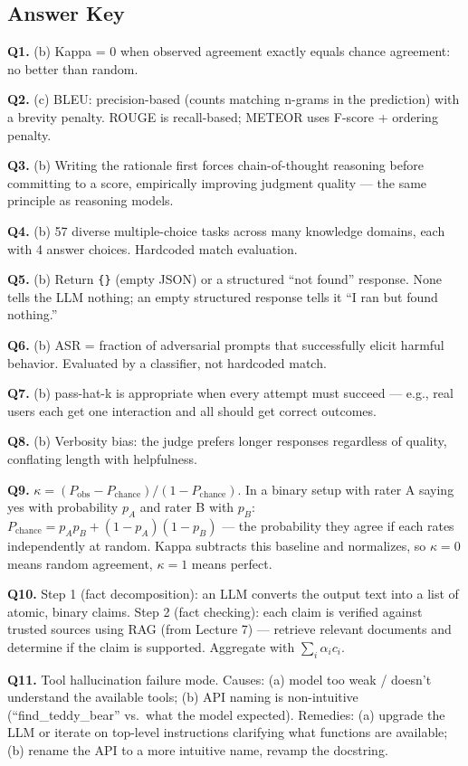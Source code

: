 \documentclass[11pt, a4paper]{article}
\begin{document}
\subsection*{Answer Key}

\textbf{Q1.} (b) Kappa = 0 when observed agreement exactly equals chance agreement: no better than random.

\textbf{Q2.} (c) BLEU: precision-based (counts matching n-grams in the prediction) with a brevity penalty. ROUGE is recall-based; METEOR uses F-score + ordering penalty.

\textbf{Q3.} (b) Writing the rationale first forces chain-of-thought reasoning before committing to a score, empirically improving judgment quality --- the same principle as reasoning models.

\textbf{Q4.} (b) 57 diverse multiple-choice tasks across many knowledge domains, each with 4 answer choices. Hardcoded match evaluation.

\textbf{Q5.} (b) Return \texttt{\{\}} (empty JSON) or a structured ``not found'' response. None tells the LLM nothing; an empty structured response tells it ``I ran but found nothing.''

\textbf{Q6.} (b) ASR = fraction of adversarial prompts that successfully elicit harmful behavior. Evaluated by a classifier, not hardcoded match.

\textbf{Q7.} (b) pass-hat-k is appropriate when every attempt must succeed --- e.g., real users each get one interaction and all should get correct outcomes.

\textbf{Q8.} (b) Verbosity bias: the judge prefers longer responses regardless of quality, conflating length with helpfulness.

\textbf{Q9.} $\kappa = (P_\text{obs} - P_\text{chance})/(1 - P_\text{chance})$. In a binary setup with rater A saying yes with probability $p_A$ and rater B with $p_B$: $P_\text{chance} = p_A p_B + (1-p_A)(1-p_B)$ --- the probability they agree if each rates independently at random. Kappa subtracts this baseline and normalizes, so $\kappa = 0$ means random agreement, $\kappa = 1$ means perfect.

\textbf{Q10.} Step 1 (fact decomposition): an LLM converts the output text into a list of atomic, binary claims. Step 2 (fact checking): each claim is verified against trusted sources using RAG (from Lecture 7) --- retrieve relevant documents and determine if the claim is supported. Aggregate with $\sum_i \alpha_i c_i$.

\textbf{Q11.} Tool hallucination failure mode. Causes: (a) model too weak / doesn't understand the available tools; (b) API naming is non-intuitive (``find\_teddy\_bear'' vs.\ what the model expected). Remedies: (a) upgrade the LLM or iterate on top-level instructions clarifying what functions are available; (b) rename the API to a more intuitive name, revamp the docstring.
\end{document}
